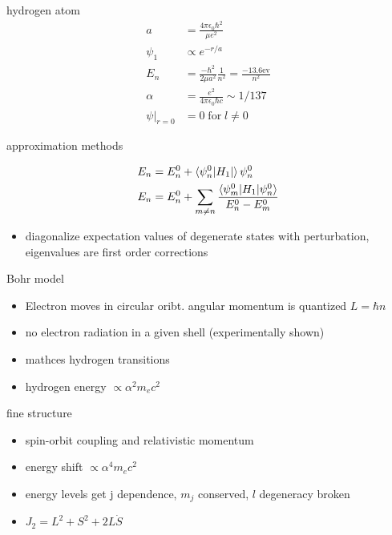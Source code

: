 \documentclass[avery5388, frame]{flashcards}
\begin{document}
\begin{flashcard}{hydrogen atom}
  {
    \begin{align*}
      a &= \frac{4 \pi \epsilon_{0} \hbar^{2}}{\mu e^{2}}\\
      \psi_{1} &\propto e^{-r/a}\\
      E_{n} &= \frac{- \hbar^{2}}{2 \mu a^{2}} \frac{1}{n^{2}} = \frac{-13.6 \textrm{ev}}{n^{2}}\\
      \alpha &= \frac{e^{2}}{4 \pi \epsilon_{0} \hbar c} \sim 1 / 137\\
      \psi \lvert_{r = 0} &= 0 \; \textrm{for} \; l \neq 0
    \end{align*}
  }
\end{flashcard}

\begin{flashcard}{approximation methods}
  {
    \begin{align*}
      E_{n} &= E_{n}^{0} + \braket{\psi_{n}^{0} \lvert H_{1} \rvert}{\psi_{n}^{0}}\\
      E_{n} &= E_{n}^{0} + \sum_{m \neq n} \frac{\braket{\psi_{m}^{0} \lvert H_{1} \rvert \psi_{n}^{0}}}{E_{n}^{0} - E_{m}^{0}}
    \end{align*}

    \begin{itemize}
    \item diagonalize expectation values of degenerate states with perturbation,
      eigenvalues are first order corrections
    \end{itemize}
  }
\end{flashcard}

\begin{flashcard}{Bohr model}
  {
    \begin{itemize}
    \item Electron moves in circular oribt. angular momentum is quantized $L = \hbar n$
    \item no electron radiation in a given shell (experimentally shown)
    \item mathces hydrogen transitions
    \item hydrogen energy $\propto \alpha^{2} m_{e} c^{2}$
    \end{itemize}
  }
\end{flashcard}

\begin{flashcard}{fine structure}
  {
    \begin{itemize}
    \item spin-orbit coupling and relativistic momentum
    \item energy shift $\propto \alpha^{4} m_{e} c^{2}$
    \item energy levels get j dependence, $m_{j}$ conserved, $l$ degeneracy broken
    \item $J_{2} = L^{2} + S^{2} + 2 L \dot S$
    \end{itemize}
  }
\end{flashcard}
\end{document}
